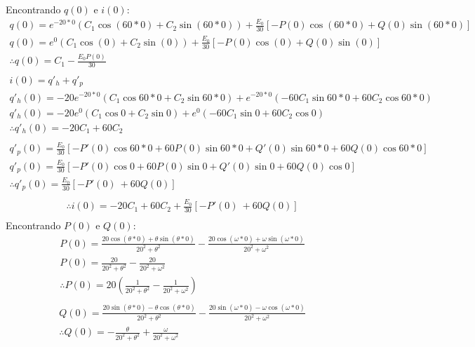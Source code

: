 \documentclass{abntex2}
\begin{document}
\Large Encontrando $q(0)$ e $i(0)$:\\
\begin{eqnarray*}
    q(0) = e^{-20*0} (C_1 \cos{(60*0)} + C_2 \sin{(60*0)}) + \frac{E_0}{30}[-P(0)\cos{(60*0)} + Q(0)\sin{(60*0)}]\\
    q(0) = e^{0} (C_1 \cos{(0)} + C_2 \sin{(0)}) + \frac{E_0}{30}[-P(0)\cos{(0)} + Q(0)\sin{(0)}]\\
    \therefore q(0) = C_1 - \frac{E_0P(0)}{30}\\
\end{eqnarray*}
\begin{eqnarray*}
    i(0) = q'_h + q'_p\\
    q'_h(0) = -20e^{-20*0} (C_1 \cos{60*0} + C_2 \sin{60*0}) + e^{-20*0} (-60C_1 \sin{60*0} + 60C_2 \cos{60*0})\\
    q'_h(0) = -20e^{0} (C_1 \cos{0} + C_2 \sin{0}) + e^{0} (-60C_1 \sin{0} + 60C_2 \cos{0})\\
    \therefore q'_h(0) = -20C_1 + 60C_2\\
\end{eqnarray*}
\begin{eqnarray*}
    q'_p(0) =  \frac{E_0}{30}[-P'(0)\cos{60*0} + 60P(0)\sin{60*0} +Q'(0)\sin{60*0} + 60Q(0)\cos{60*0}]\\
    q'_p(0) =  \frac{E_0}{30}[-P'(0)\cos{0} + 60P(0)\sin{0} +Q'(0)\sin{0} + 60Q(0)\cos{0}]\\
    \therefore q'_p(0) = \frac{E_0}{30}[-P'(0)\ + 60Q(0)]\\
\end{eqnarray*}
\begin{eqnarray*}
    \therefore i(0) = -20C_1 + 60C_2 + \frac{E_0}{30}[-P'(0)\ + 60Q(0)]\\
\end{eqnarray*}
\Large Encontrando $P(0)$ e $Q(0)$:\\
\begin{eqnarray*}
    P(0) = \frac{ 20\cos{(\theta *0)} +\theta\sin{(\theta *0)}}{20^2 +\theta^2} - \frac{20\cos{(\omega *0)} +\omega\sin{(\omega *0)}}{20^2 +\omega^2}\\
    P(0) = \frac{ 20}{20^2 +\theta^2} - \frac{20}{20^2 +\omega^2}\\
    \therefore P(0) = 20\left(\frac{1}{20^2 +\theta^2} - \frac{1}{20^2 +\omega^2}\right)\\
\end{eqnarray*}
\begin{eqnarray*}
    Q(0) = \frac{ 20\sin{(\theta *0)} -\theta\cos{(\theta *0)}}{20^2 +\theta^2} - \frac{20\sin{(\omega *0)} -\omega\cos{(\omega *0)}}{20^2 +\omega^2}\\
    \therefore Q(0) = -\frac{\theta}{20^2 +\theta^2} + \frac{\omega}{20^2 +\omega^2}\\
\end{eqnarray*}
\end{document}
